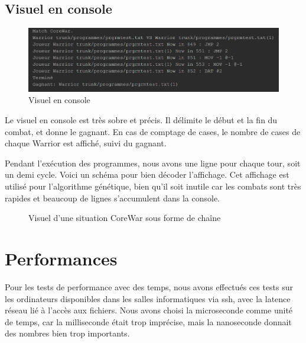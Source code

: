 \documentclass[hidelinks]{report}
\begin{document}
\subsection{Visuel en console}
\begin{figure}
    \centering
    \includegraphics[scale=0.5]{images/visuelconsole.png}
    \caption{Visuel en console}
    \label{fig:consolevisu}
\end{figure}

Le visuel en console est très sobre et précis. Il délimite le début et la fin du combat, et donne le gagnant. En cas de comptage de cases, le nombre de cases de chaque Warrior est affiché, suivi du gagnant.

Pendant l'exécution des programmes, nous avons une ligne pour chaque tour, soit un demi cycle. Voici un schéma pour bien décoder l'affichage. Cet affichage est utilisé pour l'algorithme génétique, bien qu'il soit inutile car les combats sont très rapides et beaucoup de lignes s'accumulent dans la console.

\begin{figure}[H]
    \caption{Visuel d'une situation CoreWar sous forme de chaîne}
    \label{fig:visuCoreWar}
\end{figure}

\section{Performances}
Pour les tests de performance avec des temps, nous avons effectués ces tests sur les ordinateurs disponibles dans les salles informatiques via ssh, avec la latence réseau lié à l'accès aux fichiers. Nous avons choisi la microseconde comme unité de temps, car la milliseconde était trop imprécise, mais la nanoseconde donnait des nombres bien trop importants.
\end{document}
